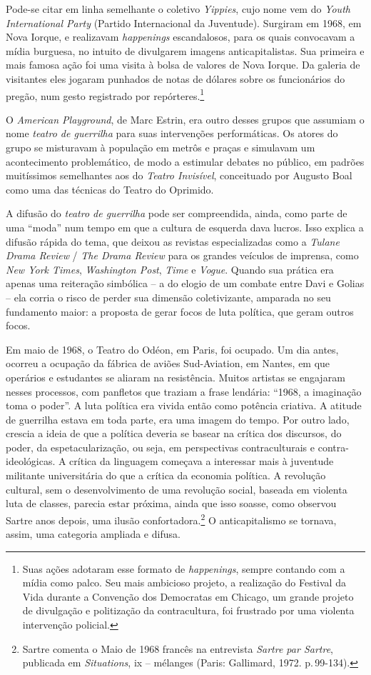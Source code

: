 Pode-se citar em linha semelhante o coletivo {\it Yippies}, cujo nome
vem do {\it Youth International Party} (Partido Internacional da
Juventude). Surgiram em 1968, em Nova Iorque, e realizavam
{\it happenings} escandalosos, para os quais convocavam a mídia
burguesa, no intuito de divulgarem imagens anticapitalistas. Sua
primeira e mais famosa ação foi uma visita à bolsa de valores de Nova
Iorque. Da galeria de visitantes eles jogaram punhados de notas de
dólares sobre os funcionários do pregão, num gesto registrado por
repórteres.\footnote{Suas ações adotaram esse formato de
  {\it happenings}, sempre contando com a mídia como palco. Seu mais
  ambicioso projeto, a realização do Festival da Vida durante a
  Convenção dos Democratas em Chicago, um grande projeto de divulgação e
  politização da contracultura, foi frustrado por uma violenta
  intervenção policial.}

O {\it American Playground}, de Marc Estrin, era outro desses grupos que
assumiam o nome {\it teatro de guerrilha} para suas intervenções
performáticas. Os atores do grupo se misturavam à população em metrôs e
praças e simulavam um acontecimento problemático, de modo a estimular
debates no público, em padrões muitíssimos semelhantes aos do
{\it Teatro Invisível}, conceituado por Augusto Boal como uma das
técnicas do Teatro do Oprimido.

A difusão do {\it teatro de guerrilha} pode ser compreendida, ainda,
como parte de uma “moda” num tempo em que a cultura de esquerda dava
lucros. Isso explica a difusão rápida do tema, que deixou as revistas
especializadas como a {\it Tulane Drama Review} / {\it The Drama Review}
para os grandes veículos de imprensa, como {\it New York Times},
{\it Washington Post}, {\it Time} e {\it Vogue}. Quando sua prática era
apenas uma reiteração simbólica -- a do elogio de um combate entre Davi e
Golias -- ela corria o risco de perder sua dimensão coletivizante,
amparada no seu fundamento maior: a proposta de gerar focos de luta
política, que geram outros focos.

Em maio de 1968, o Teatro do Odéon, em Paris, foi ocupado. Um dia antes,
ocorreu a ocupação da fábrica de aviões Sud-Aviation, em Nantes, em que
operários e estudantes se aliaram na resistência. Muitos artistas se
engajaram nesses processos, com panfletos que traziam a frase lendária:
“1968, a imaginação toma o poder”. A luta política era vivida então como
potência criativa. A atitude de guerrilha estava em toda parte, era uma
imagem do tempo. Por outro lado, crescia a ideia de que a política
deveria se basear na crítica dos discursos, do poder, da
espetacularização, ou seja, em perspectivas contraculturais e
contra-ideológicas. A crítica da linguagem começava a interessar mais à
juventude militante universitária do que a crítica da economia política.
A revolução cultural, sem o desenvolvimento de uma revolução social,
baseada em violenta luta de classes, parecia estar próxima, ainda que
isso soasse, como observou Sartre anos depois, uma ilusão
confortadora.\footnote{Sartre comenta o Maio de 1968 francês na
  entrevista {\it Sartre par Sartre}, publicada em {\it Situations}, {\sc ix}
  -- mélanges (Paris: Gallimard, 1972. p.\,99-134).} O anticapitalismo se
tornava, assim, uma categoria ampliada e difusa.

